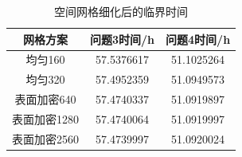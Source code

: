\begin{table}[H]\centering
\caption{空间网格细化后的临界时间}\label{tab:grids}
\begin{tabular}{ccc}\toprule
网格方案 & 问题3时间/h & 问题4时间/h\\ \midrule
均匀160 & 57.5376617 & 51.1025264\\
均匀320 & 57.4952359 & 51.0949573\\
表面加密640 & 57.4740337 & 51.0919897\\
表面加密1280 & 57.4740064 & 51.0919997\\
表面加密2560 & 57.4739997 & 51.0920024\\
\bottomrule\end{tabular}\end{table}
